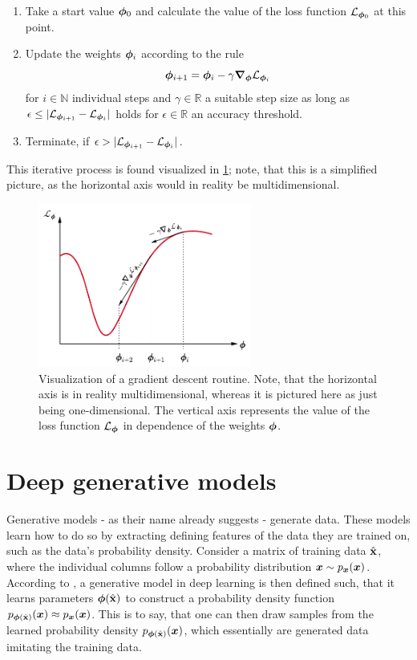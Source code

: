 \documentclass[a4paper,12pt]{report}
\begin{document}
\begin{enumerate}
\item Take a start value $\bm{\phi}_0$ and calculate the value of the loss function $\mathcal{L}_{\bm{\phi}_0}$ at this point.
\item Update the weights $\bm{\phi}_{i}$ according to the rule \begin{equation}
\bm{\phi}_{i+1} = \bm{\phi}_{i} - \gamma \bm{\nabla}_{\bm{\phi}}\mathcal{L}_{\bm{\phi}_i}
\end{equation} for $i \in \mathbb{N}$ individual steps and $\gamma \in \mathbb{R}$ a suitable step size as long as $\epsilon \leq |\mathcal{L}_{\bm{\phi}_{i+1}}-\mathcal{L}_{\bm{\phi}_{i}}|$ holds for $\epsilon \in \mathbb{R}$ an accuracy threshold.
\item Terminate, if $\epsilon > |\mathcal{L}_{\bm{\phi}_{i+1}}-\mathcal{L}_{\bm{\phi}_{i}}|$.
\end{enumerate}
This iterative process is found visualized in \cref{fig:gradientdescent}; note, that this is a simplified picture, as the horizontal axis would in reality be multidimensional.
\begin{figure}[h]
\centering
\includegraphics[width=7cm]{figures/gradientdescent.pdf}
\caption{Visualization of a gradient descent routine. Note, that the horizontal axis is in reality multidimensional, whereas it is pictured here as just being one-dimensional. The vertical axis represents the value of the loss function $\mathcal{L}_{\bm{\phi}}$ in dependence of the weights $\bm{\phi}$.}
\label{fig:gradientdescent}
\end{figure}

\section{Deep generative models}
Generative models - as their name already suggests - generate data. These models learn how to do so by extracting defining features of the data they are trained on, such as the data's probability density. Consider a matrix of training data $\hat{\boldsymbol{\mathbf{x}}}$, where the individual columns follow a probability distribution $\bm{x} \sim p_{\bm{x}}(\bm{x})$. According to \cite[p.593]{Raschka.2022}, a generative model in deep learning is then defined such, that it learns parameters $\bm{\phi}(\hat{\boldsymbol{\mathbf{x}}})$ to construct a probability density function $p_{\bm{\phi}(\hat{\boldsymbol{\mathbf{x}}})}(\bm{x}) \approx p_{\bm{x}}(\bm{x})$. This is to say, that one can then draw samples from the learned probability density $p_{\bm{\phi}(\hat{\boldsymbol{\mathbf{x}}})}(\bm{x})$, which essentially are generated data imitating the training data.
\end{document}
